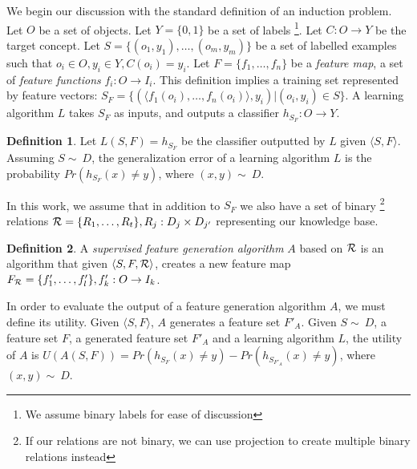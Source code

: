 \documentclass[twoside,11pt]{article}
\theoremstyle{definition}
\newtheorem{defn}{Definition}[section]
\begin{document}
We begin our discussion with the standard definition of an induction problem. 
Let $O$ be a set of objects. Let $Y=\{0,1\}$ be a set of labels \footnote{We assume binary labels for ease of discussion}. Let $C:O\rightarrow Y$ be the target concept. Let $S=\{(o_{1},y_{1}),\ldots,(o_{m},y_{m})\}$ be a set of labelled examples such that $o_{i}\in O, y_{i}\in Y, C(o_i)=y_i$. 
Let $F=\{f_{1},\ldots,f_{n}\}$ be a \emph{feature map}, a set of \emph{feature functions} $f_{i}:O\rightarrow I_{i}$.  This definition implies a training set represented by feature vectors: $S_F=\{ (\langle f_1(o_i),\ldots,f_n(o_i)\rangle, y_i) | (o_i,y_i) \in S\}$. A learning algorithm $L$ takes $S_F$ as inputs, and outputs a classifier $h_{S_F}:O\rightarrow Y$.
\begin{defn}
	Let $L(S,F)=h_{S_F}$ be the classifier outputted by $L$ given $\langle S,F\rangle$. Assuming $S\sim\ D$, the generalization error of a learning algorithm $L$ is the probability $Pr(h_{S_F}(x)\neq y)$, where $(x,y)\sim\ D$.
\end{defn}


In this work, we assume that in addition to $S_F$ we also have a set of binary \footnote{If our relations are not binary, we can use projection to create multiple binary relations instead} relations ${\cal R}=\{R_{1},\ldots,R_{t}\}, R_j:D_j\times D_{j'}$ representing our knowledge base. 
\begin{defn}
	A \emph{supervised feature generation algorithm} $A$ based on ${\cal R}$ is an algorithm that given $\langle S,F,{\cal R} \rangle$, creates a new feature map $F_{{\cal R}}=\{f'_{1},\ldots,f'_{l}\}, f'_{k}:O\rightarrow I_k$.
\end{defn}

In order to evaluate the output of a feature generation algorithm $A$, we must define its utility. Given $\langle S,F \rangle$, $A$ generates a feature set $F'_A$.
Given $S\sim\ D$, a feature set $F$, a generated feature set $F'_A$ and a learning algorithm $L$, the utility of $A$ is $U(A(S,F))=Pr(h_{S_F}(x)\neq y)-Pr(h_{S_{F'_A}}(x)\neq y)$, where $(x,y)\sim\ D$.
\end{document}
